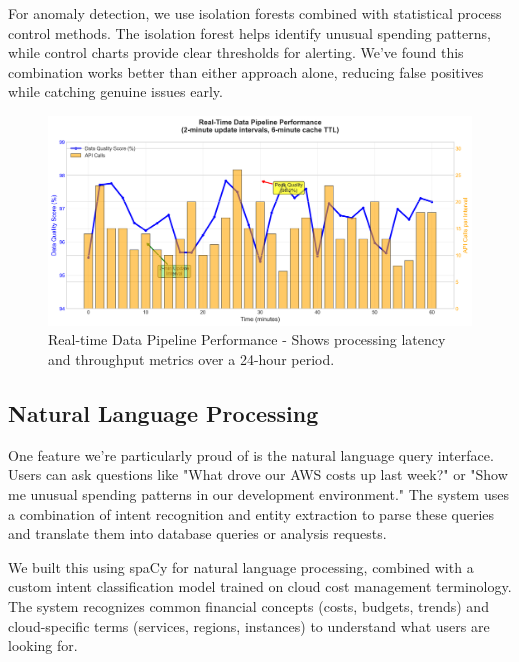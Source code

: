 \documentclass[conference]{IEEEtran}
\begin{document}
For anomaly detection, we use isolation forests combined with statistical process control methods. The isolation forest helps identify unusual spending patterns, while control charts provide clear thresholds for alerting. We've found this combination works better than either approach alone, reducing false positives while catching genuine issues early.

\begin{figure}[h]
    \centering
    \begin{mdframed}[style=imagestyle]
        \includegraphics[width=\columnwidth]{docs/images/realtime_pipeline.png}
    \end{mdframed}
    \caption{Real-time Data Pipeline Performance - Shows processing latency and throughput metrics over a 24-hour period.}
    \label{fig:pipeline}
\end{figure}

\subsection{Natural Language Processing}

One feature we're particularly proud of is the natural language query interface. Users can ask questions like "What drove our AWS costs up last week?" or "Show me unusual spending patterns in our development environment." The system uses a combination of intent recognition and entity extraction to parse these queries and translate them into database queries or analysis requests.

We built this using spaCy for natural language processing, combined with a custom intent classification model trained on cloud cost management terminology. The system recognizes common financial concepts (costs, budgets, trends) and cloud-specific terms (services, regions, instances) to understand what users are looking for.
\end{document}
